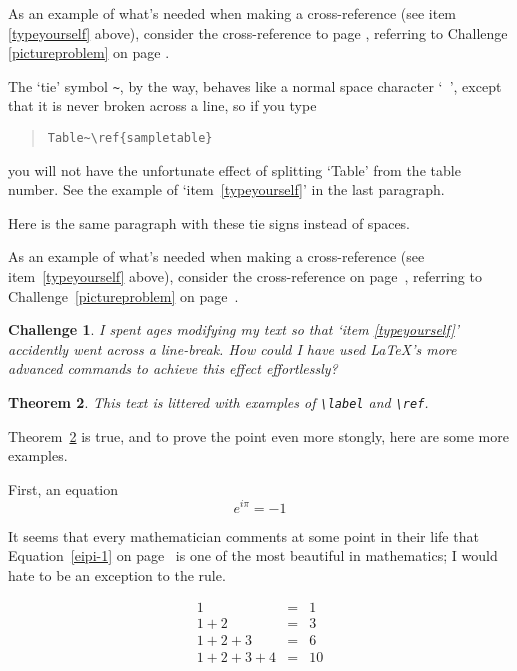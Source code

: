 \documentclass[a4paper]{article}
\newtheorem{thm}{Theorem}[section]
\newtheorem{chall}[thm]{Challenge}
\begin{document}
As an example of what's needed when making a cross-reference 
(see item \ref{typeyourself} above), consider the
cross-reference to page \pageref{selfref}\label{selfref},
referring to Challenge \ref{pictureproblem} on 
page \pageref{pictureproblem}.

The `tie' symbol \verb|~|, by the way, behaves like a normal space
character `\verb| |', except that it is never broken across
a line, so if you type \begin{quote}\verb|Table~\ref{sampletable}|\end{quote} 
you will not have the unfortunate effect of splitting `Table'
from the table number.  See the example of `item~\ref{typeyourself}'
in the last paragraph.

Here is the same paragraph with these tie signs instead of
spaces.

As an example of what's needed when making a cross-reference 
(see item~\ref{typeyourself} above), consider the
cross-reference on page~\pageref{selfrefa}\label{selfrefa},
referring to Challenge~\ref{pictureproblem} on 
page~\pageref{pictureproblem}.

\begin{chall}  I spent ages modifying my text so that 
`item \ref{typeyourself}' accidently went across a line-break.
How could I have used \LaTeX's more advanced commands to
achieve this effect effortlessly?
\end{chall}

\begin{thm}\label{examplethm} This text is littered
with examples of \verb|\label| and \verb|\ref|.
\end{thm}

Theorem~\ref{examplethm} is true, and to prove the point 
even more stongly,  here are some more examples.

First, an equation
\begin{equation}
e^{i\pi}=-1 \label{eipi-1}
\end{equation}

It seems that every mathematician comments at some point in their
life that Equation~\ref{eipi-1} on page~\pageref{eipi-1}
is one of the most beautiful in mathematics;  
I would hate to be an exception to the rule.

\begin{eqnarray}
1 & = & 1 \label{tri1}\\
1 +2 & = & 3 \label{tri2}\\
1 +2+3 & = & 6 \nonumber\\
1 +2+3 +4& = & 10 \label{tri4}
\end{eqnarray}
\end{document}
